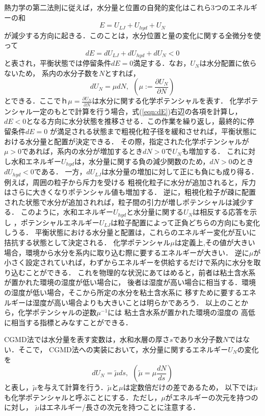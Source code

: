 熱力学の第二法則に従えば，水分量と位置の自発的変化はこれら3つのエネルギーの和
\begin{equation}
	E=U_{LJ}+U_{hyd}+U_{N}
	\label{eqn:}
\end{equation}
が減少する方向に起きる．このことは，水分位置と量の変化に関する全微分を使って
\begin{equation}
	dE = dU_{LJ}+dU_{hyd}+dU_N <0
	\label{eqn:dE}
\end{equation}
と表され，平衡状態では停留条件$dE=0$満足する．なお，$U_N$は水分配置に依らないため，
系内の水分子数を$N$とすれば，
\begin{equation}
	dU_N=\mu dN, \ \ \left(  \mu:=\frac{\partial U_N}{\partial N}\right)
	\label{eqn:}
\end{equation}
とできる．ここでｈ$\mu=\frac{\partial U_N}{\partial N}$は水分に関する化学ポテンシャルを表す．
化学ポテンシャル一定のもとで計算を行う場合，式(\ref{eqn:dE})右辺の各項を計算し，
$dE<0$となる方向に水分状態を推移させる．この作業を繰り返し，最終的に停留条件$dE=0$
が満足される状態まで粗視化粒子径を緩和させれば，平衡状態における水分量と配置が決定できる．
その際，指定された化学ポテンシャルが$\mu>0$であれば，系内の水分が増加するとき$dN>0$で$U_N$も増加する．
これに対し水和エネルギー$U_{hyd}$は，水分量に関する負の減少関数のため，$dN>0$のとき$dU_{hyd}<0$である．
一方，$dU_{LJ}$は水分量の増加に対して正にも負にも成り得る．例えば，周囲の粒子から斥力を受ける
粗視化粒子に水分が追加されると，斥力はさらに大きくなりポテンシャル値も増加する．
逆に，粗視化粒子が疎に配置された状態で水分が追加されれば，粒子間の引力が増しポテンシャルは減少する．
このように，水和エネルギー$U_{hyd}$と水分量に関する$U_N$は相反する応答を示し
，ポテンシャルエネルギー$U_{LJ}$は粒子配置によって正負どちらの方向にも変化しうる．
平衡状態における水分量と配置は，これらのエネルギー変化が互いに拮抗する状態として決定される．
化学ポテンシャル$\mu$は定義上,その値が大きい場合，環境から水分を系内に取り込む際に要するエネルギーが大きい．
逆に$\mu$が小さく設定されていれば，わずからエネルギーを供給するだけで系内に水分を取り込むことができる．
これを物理的な状況にあてはめると，前者は粘土含水系が置かれた環境の湿度が低い場合に，
後者は湿度が高い場合に相当する．環境の湿度が低い場合，そこから所定の水分を粘土含水系に
移すために要するエネルギーは湿度が高い場合よりも大きいことは明らかであろう．
以上のことから，化学ポテンシャルの逆数$\mu^{-1}$には 粘土含水系が置かれた環境の湿度の
高低に相当する指標とみなすことができる．

CGMD法では水分量を表す変数は，水和水層の厚さ$s$であり水分子数$N$ではない．そこで，
CGMD法への実装において，水分量に関するエネルギー$U_N$の変化を
\begin{equation}
	dU_N=\tilde \mu ds, \ \ \left( \tilde \mu =\mu \frac{dN}{ds} \right)
	\label{eqn:}
\end{equation}
と表し，$\tilde \mu$を与えて計算を行う．$\tilde \mu$と$\mu$は定数倍だけの差であるため，
以下では$\tilde \mu$も化学ポテンシャルと呼ぶことにする．ただし，$\mu$がエネルギーの次元を持つのに対し，
$\tilde \mu$はエネルギー/長さの次元を持つことに注意する．
